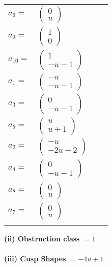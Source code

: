 \documentclass[1p]{elsarticle_modified}
\theoremstyle{definition}
\begin{document}
\begin{tabular}{m{7pt} m{180pt} m{7pt} m{180pt} }
\flushright $a_{6}=$&$\begin{pmatrix}0\\u\end{pmatrix}$ \\
\flushright $a_{9}=$&$\begin{pmatrix}1\\0\end{pmatrix}$ \\
\flushright $a_{10}=$&$\begin{pmatrix}1\\- u-1\end{pmatrix}$ \\
\flushright $a_{1}=$&$\begin{pmatrix}- u\\- u-1\end{pmatrix}$ \\
\flushright $a_{3}=$&$\begin{pmatrix}0\\- u-1\end{pmatrix}$ \\
\flushright $a_{5}=$&$\begin{pmatrix}u\\u+1\end{pmatrix}$ \\
\flushright $a_{2}=$&$\begin{pmatrix}- u\\-2 u-2\end{pmatrix}$ \\
\flushright $a_{4}=$&$\begin{pmatrix}0\\- u-1\end{pmatrix}$ \\
\flushright $a_{8}=$&$\begin{pmatrix}0\\u\end{pmatrix}$ \\
\flushright $a_{7}=$&$\begin{pmatrix}0\\u\end{pmatrix}$\\&\end{tabular}
\flushleft \textbf{(ii) Obstruction class $= 1$}\\~\\
\flushleft \textbf{(iii) Cusp Shapes $= -4 u+1$}\\~\\
\end{document}
